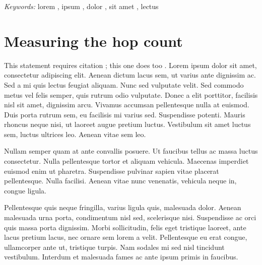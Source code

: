 \documentclass[paper=a4, fontsize=10pt]{scrartcl} %
\numberwithin{equation}{section} %
\numberwithin{figure}{section} %
\numberwithin{table}{section} %
\begin{document}
        \hspace*{3,6mm}\textit{Keywords:} lorem , ipsum , dolor , sit amet , lectus %
                
        \vspace{30pt} 

        \section{Measuring the hop count}
        This statement requires citation \cite{Smith:2012qr}; this one does too \cite{Smith:2013jd}. Lorem ipsum dolor sit\cite{Chen:2004:UBP:2285778.2286085} amet, consectetur adipiscing elit. Aenean dictum lacus sem, ut varius ante dignissim ac. Sed a mi quis lectus feugiat aliquam. Nunc sed vulputate velit. Sed commodo metus vel felis semper, quis rutrum odio vulputate. Donec a elit porttitor, facilisis nisl sit amet, dignissim arcu. Vivamus accumsan pellentesque nulla at euismod. Duis porta rutrum sem, eu facilisis mi varius sed. Suspendisse potenti. Mauris rhoncus neque nisi, ut laoreet augue pretium luctus. Vestibulum sit amet luctus sem, luctus ultrices leo. Aenean vitae sem leo.

        Nullam semper quam at ante convallis posuere. Ut faucibus tellus ac massa luctus consectetur. Nulla pellentesque tortor et aliquam vehicula. Maecenas imperdiet euismod enim ut pharetra. Suspendisse pulvinar sapien vitae placerat pellentesque. Nulla facilisi. Aenean vitae nunc venenatis, vehicula neque in, congue ligula.

        Pellentesque quis neque fringilla, varius ligula quis, malesuada dolor. Aenean malesuada urna porta, condimentum nisl sed, scelerisque nisi. Suspendisse ac orci quis massa porta dignissim. Morbi sollicitudin, felis eget tristique laoreet, ante lacus pretium lacus, nec ornare sem lorem a velit. Pellentesque eu erat congue, ullamcorper ante ut, tristique turpis. Nam sodales mi sed nisl tincidunt vestibulum. Interdum et malesuada fames ac ante ipsum primis in faucibus.





        
\end{document}
